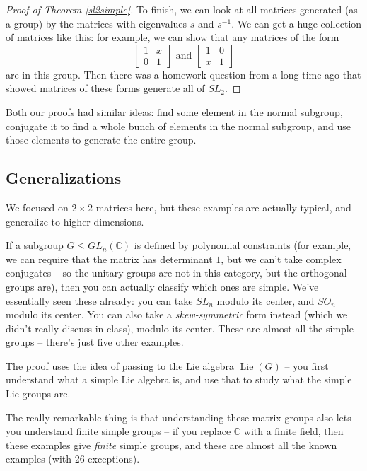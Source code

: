 \begin{proof}[Proof of Theorem \ref{sl2simple}]
    To finish, we can look at all matrices generated (as a group) by the matrices with eigenvalues $s$ and $s^{-1}$. We can get a huge collection of matrices like this: for example, we can show that any matrices of the form \[\begin{bmatrix} 1 & x \\ 0 & 1 \end{bmatrix} \text{ and } \begin{bmatrix} 1& 0 \\ x & 1 \end{bmatrix}\] are in this group. Then there was a homework question from a long time ago that showed matrices of these forms generate all of $SL_2$. 
\end{proof}

Both our proofs had similar ideas: find some element in the normal subgroup, conjugate it to find a whole bunch of elements in the normal subgroup, and use those elements to generate the entire group. 

\subsection{Generalizations}

We focused on $2 \times 2$ matrices here, but these examples are actually typical, and generalize to higher dimensions. 

If a subgroup $G \leq GL_n(\mathbb{C})$ is defined by polynomial constraints (for example, we can require that the matrix has determinant $1$, but we can't take complex conjugates -- so the unitary groups are not in this category, but the orthogonal groups are), then you can actually classify which ones are simple. We've essentially seen these already: you can take $SL_n$ modulo its center, and $SO_n$ modulo its center. You can also take a \emph{skew-symmetric} form instead (which we didn't really discuss in class), modulo its center. These are almost all the simple groups -- there's just five other examples.

The proof uses the idea of passing to the Lie algebra $\operatorname{Lie}(G)$ -- you first understand what a simple Lie algebra is, and use that to study what the simple Lie groups are. 

The really remarkable thing is that understanding these matrix groups also lets you understand finite simple groups -- if you replace $\mathbb{C}$ with a finite field, then these examples give \emph{finite} simple groups, and these are almost all the known examples (with $26$ exceptions). 

\newpage